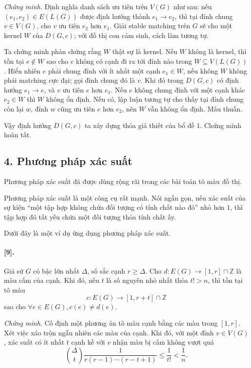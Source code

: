 \documentclass[11pt]{article}
\begin{document}
\emph{Chứng minh.}
Định nghĩa danh sách ưu tiên trên \(V(G)\) như sau: nếu
\((e_1,e_2)\in E(L(G))\) được định hướng thành \(e_1\to e_2\), thì tại đỉnh
chung \(v\in V(G)\), cho \(v\) ưu tiên \(e_2\) hơn \(e_1\). Giải stable
matching trên \(G\) sẽ cho một kernel \(W\) của \(D(G,c)\); với đồ thị con cảm
sinh, cách làm tương tự.

Ta chứng minh phản chứng rằng \(W\) thật sự là kernel. Nếu \(W\) không là
kernel, thì tồn tại \(e\notin W\) sao cho \(e\) không có cạnh đi ra tới đỉnh nào
trong \(W\subseteq V(L(G))\). Hiển nhiên \(e\) phải chung đỉnh với ít nhất một
cạnh \(e_1\in W\), nếu không \(W\) không phải matching cực đại; gọi đỉnh chung
đó là \(v\). Khi đó trong \(D(G,c)\) có định hướng \(e_1\to e\), và \(v\) ưu
tiên \(e\) hơn \(e_1\). Nếu \(e\) không chung đỉnh với một cạnh khác \(e_2\in W\)
thì \(W\) không ổn định. Nếu có, lập luận tương tự cho thấy tại đỉnh chung
còn lại \(w\), đỉnh \(w\) cũng ưu tiên \(e\) hơn \(e_2\), nên \(W\) vẫn không
ổn định. Mâu thuẫn.

Vậy định hướng \(D(G,c)\) ta xây dựng thỏa giả thiết của bổ đề 1. Chứng minh
hoàn tất.

\subsection*{4. Phương pháp xác suất}

Phương pháp xác suất đã được dùng rộng rãi trong các bài toán tô màu đồ thị.

Phương pháp xác suất là một công cụ rất mạnh. Nói ngắn gọn, nếu xác suất của
sự kiện ``một tập hợp không chứa đối tượng có tính chất nào đó'' nhỏ hơn \(1\),
thì tập hợp đó tất yếu chứa một đối tượng thỏa tính chất ấy.

Dưới đây là một ví dụ ứng dụng phương pháp xác suất.

\paragraph{ [9].}
Giả sử \(G\) có bậc lớn nhất \(\Delta\), số sắc cạnh \(r\ge\Delta\). Cho
\(d:E(G)\to[1,r]\cap\mathbb Z\) là màu cấm của cạnh. Khi đó, nếu \(t\) là số
nguyên nhỏ nhất thỏa \(t!>n\), thì tồn tại tô màu
\[
  c:E(G)\to[1,r+t]\cap\mathbb Z
\]
sao cho \(\forall e\in E(G), c(e)\ne d(e)\).

\emph{Chứng minh.}
Cố định một phương án tô màu cạnh bằng các màu trong \([1,r]\). Xét việc xáo
trộn ngẫu nhiên các màu của cạnh. Khi đó, với một đỉnh \(v\in V(G)\), xác suất
có ít nhất \(t\) cạnh kề với \(v\) nhận màu bị cấm không vượt quá
\[
  \binom{\Delta}{t}\frac{1}{r(r-1)\cdots(r-t+1)}
  \le \frac1{t!}<\frac1n.
\]
\end{document}

